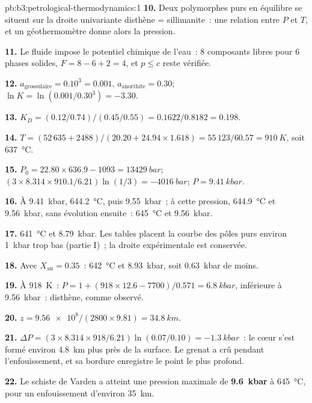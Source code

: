 \begin{solution}{pb:b3:petrological-thermodynamics:1}
\textbf{10.} Deux polymorphes purs  en équilibre se situent sur la
droite univariante disthène = sillimanite~: une relation entre $P$ et $T$, et un
géothermomètre donne alors la pression.

\textbf{11.} Le fluide impose le potentiel chimique de l'eau~: 8 composants libres
pour 6 phases solides, $F = 8 - 6 + 2 = 4$, et $p \le c$ reste
vérifiée.

\textbf{12.} $a_{\text{grossulaire}} = 0.10^3 = 0.001$, $a_{\text{anorthite}} =
0.30$; $\ln K = \ln(0.001/0.30^3) = -3.30$.

\textbf{13.} $K_D = (0.12/0.74)/(0.45/0.55) = 0.1622/0.8182 = 0.198$.

\textbf{14.} $T = (52\,635 + 2488)/(20.20 + 24.94\times1.618) = 55\,123/60.57
= \qty{910}{K}$, soit \qty{637}{\celsius}.

\textbf{15.} $P_0 = 22.80\times636.9 - 1093 = \qty{13429}{bar}$; $(3\times8.314
\times910.1/6.21)\ln(1/3) = \qty{-4016}{bar}$; $P = \qty{9.41}{kbar}$.

\textbf{16.} À \qty{9.41}{kbar}, \qty{644.2}{\celsius}, puis
\qty{9.55}{kbar}~; à cette pression, \qty{644.9}{\celsius} et
\qty{9.56}{kbar}, sans évolution ensuite~: \qty{645}{\celsius} et
\qty{9.56}{kbar}.

\textbf{17.} \qty{641}{\celsius} et \qty{8.79}{kbar}. Les tables placent la
courbe des pôles purs environ \qty{1}{kbar} trop bas (partie I)~; la droite
expérimentale est conservée.

\textbf{18.} Avec $X_{\text{an}} = 0.35$~: \qty{642}{\celsius} et
\qty{8.93}{kbar}, soit \qty{0.63}{kbar} de moins.

\textbf{19.} À \qty{918}{K}~: $P = 1 + (918\times12.6 - 7700)/0.571 =
\qty{6.8}{kbar}$, inférieure à \qty{9.56}{kbar}~: disthène, comme observé.

\textbf{20.} $z = \num{9.56e8}/(2800\times9.81) = \qty{34.8}{km}$.

\textbf{21.} $\Delta P = (3\times8.314\times918/6.21)\ln(0.07/0.10) =
\qty{-1.3}{kbar}$~: le cœur s'est formé environ \qty{4.8}{km} plus près de la surface. Le grenat
a crû pendant l'enfouissement, et sa bordure enregistre le point le plus profond.

\textbf{22.} Le schiste de Varden a atteint une pression maximale de
\textbf{\qty[text-series-to-math=true]{9.6}{kbar}} à
\qty{645}{\celsius}, pour un enfouissement d'environ \qty{35}{km}.
\end{solution}
